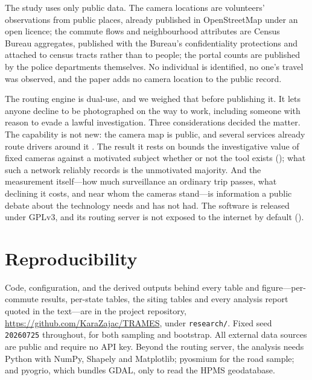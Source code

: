 \documentclass[11pt,twoside]{article}
\begin{document}
The study uses only public data. The camera locations are volunteers' observations from public
places, already published in OpenStreetMap under an open licence; the commute flows and
neighbourhood attributes are Census Bureau aggregates, published with the Bureau's
confidentiality protections and attached to census tracts rather than to people; the portal
counts are published by the police departments themselves. No individual is identified, no
one's travel was observed, and the paper adds no camera location to the public record.

The routing engine is dual-use, and we weighed that before publishing it. It lets anyone decline
to be photographed on the way to work, including someone with reason to evade a lawful
investigation. Three considerations decided the matter. The capability is not new: the camera
map is public, and several services already route drivers around it
\citep{deflockmaps,flockhopper,banditkin}. The result it rests on bounds the investigative
value of fixed cameras against a motivated subject whether or not the tool exists
(); what such a network reliably records is the unmotivated majority. And
the measurement itself---how much surveillance an ordinary trip passes, what declining it costs,
and near whom the cameras stand---is information a public debate about the technology needs and
has not had. The software is released under GPLv3, and its routing server is not exposed to the
internet by default ().

\section{Reproducibility}

Code, configuration, and the derived outputs behind every table and figure---per-commute
results, per-state tables, the siting tables and every analysis report quoted in the text---are
in the project repository, \url{https://github.com/KaraZajac/TRAMES}, under
\texttt{research/}. Fixed seed \texttt{20260725} throughout, for both sampling and bootstrap.
All external data sources are public and require no API key. Beyond the routing server, the
analysis needs Python with NumPy, Shapely and Matplotlib; pyosmium for the road sample; and
pyogrio, which bundles GDAL, only to read the HPMS geodatabase.
\end{document}
